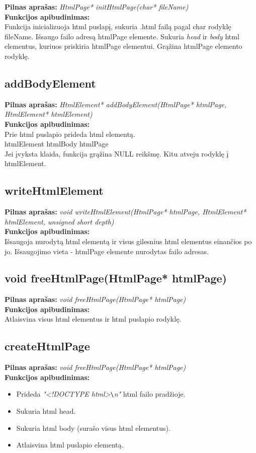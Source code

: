 \documentclass[a4paper,10pt]{article}
\begin{document}
\textbf{Pilnas aprašas:} \textit{HtmlPage* initHtmlPage(char* fileName)}
\\\textbf{Funkcijos apibudinimas:}
\\Funkcija inicializuoja html puslapį, sukuria .html failą pagal char rodyklę fileName. Išsaugo failo adresą htmlPage elemente.
Sukuria \textit{head} ir \textit{body} html elementus, kuriuos priskiria htmlPage elementui. Grąžina htmlPage elemento rodyklę.


\subsection{addBodyElement}
\textbf{Pilnas aprašas:} \textit{HtmlElement* addBodyElement(HtmlPage* htmlPage, HtmlElement* htmlElement)}
\\\textbf{Funkcijos apibudinimas:}
\\Prie html puslapio prideda html elementą.
\\htmlElement \rightarrow{} htmlBody \rightarrow{} htmlPage
\\Jei įvyksta klaida, funkcija grąžina NULL reikšmę. Kitu atveju rodyklę į htmlElement.

\subsection*{writeHtmlElement}
\textbf{Pilnas aprašas:} \textit{void writeHtmlElement(HtmlPage* htmlPage, HtmlElement* htmlElement, unsigned short depth)}
\\\textbf{Funkcijos apibudinimas:}
\\Išsaugoja nurodytą html elementą ir visus gilesnius html elementus einančios po jo. Išsaugojimo vieta - htmlPage elemente nurodytas failo adresas.

\subsection{void freeHtmlPage(HtmlPage* htmlPage)}
\textbf{Pilnas aprašas:} \textit{void freeHtmlPage(HtmlPage* htmlPage)}
\\\textbf{Funkcijos apibudinimas:}
\\Atlaisvina visus html elementus ir html puslapio rodyklę.

\subsection{createHtmlPage}
\textbf{Pilnas aprašas:} \textit{void freeHtmlPage(HtmlPage* htmlPage)}
\\\textbf{Funkcijos apibudinimas:}
\begin{itemize}
\item Prideda \textit{"<!DOCTYPE html>}\verb|\|\textit{n"} html failo pradžioje. 
\item Sukuria html head.
\item Sukuria html body (surašo visus html elementus).
\item Atlaisvina html puslapio elementą.
\end{itemize}
\end{document}

